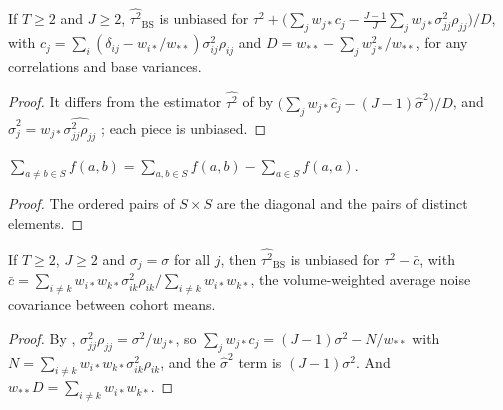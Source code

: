 \begin{theorem}\label{thm:bs_tauHat_general}
  \leanok
  If $T \ge 2$ and $J \ge 2$, $\widehat{\tau^2}_{\mathrm{BS}}$ is unbiased for
  $\tau^2 + \bigl(\sum_j w_{j*}c_j - \tfrac{J-1}{J}\sum_j w_{j*}\sigma^2_{jj}\rho_{jj}\bigr)/D$, with
  $c_j = \sum_i(\delta_{ij} - w_{i*}/w_{**})\sigma^2_{ij}\rho_{ij}$ and
  $D = w_{**} - \sum_j w_{j*}^2/w_{**}$, for any correlations and base variances.
\end{theorem}
\begin{proof}
  \leanok
  It differs from the estimator $\widehat{\tau^2}$ of  by
  $\bigl(\sum_j w_{j*}\hat c_j - (J-1)\hat\sigma^2\bigr)/D$, and
  $\hat\sigma_j^2 = w_{j*}\widehat{\sigma^2_{jj}\rho_{jj}}$ ; each piece is unbiased.
\end{proof}

\begin{lemma}\label{lem:sum_offDiag}
  \leanok
  $\sum_{a \ne b \in S} f(a, b) = \sum_{a, b \in S} f(a, b) - \sum_{a \in S} f(a, a)$.
\end{lemma}
\begin{proof}
  \leanok
  The ordered pairs of $S \times S$ are the diagonal and the pairs of distinct elements.
\end{proof}

\begin{theorem}\label{thm:bs_tauHat_corr}
  \leanok
  If $T \ge 2$, $J \ge 2$ and $\sigma_j = \sigma$ for all $j$, then $\widehat{\tau^2}_{\mathrm{BS}}$
  is unbiased for $\tau^2 - \bar c$, with
  $\bar c = \sum_{i\ne k} w_{i*}w_{k*}\sigma^2_{ik}\rho_{ik} / \sum_{i\ne k} w_{i*}w_{k*}$,
  the volume-weighted average noise covariance between cohort means.
\end{theorem}
\begin{proof}
  \leanok
  By , $\sigma^2_{jj}\rho_{jj} = \sigma^2/w_{j*}$, so
  $\sum_j w_{j*}c_j = (J-1)\sigma^2 - N/w_{**}$ with $N = \sum_{i\ne k} w_{i*}w_{k*}\sigma^2_{ik}\rho_{ik}$,
  and the $\hat\sigma^2$ term is $(J-1)\sigma^2$. And $w_{**}D = \sum_{i\ne k}w_{i*}w_{k*}$.
\end{proof}

